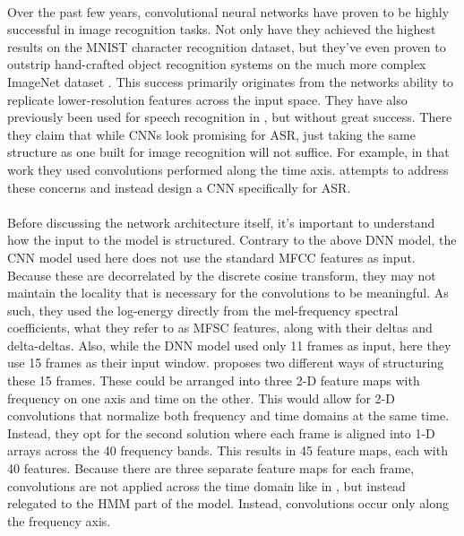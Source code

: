 \documentclass[letterpaper]{article}
\begin{document}
\paragraph{} Over the past few years, convolutional neural networks have proven to be highly successful in image recognition tasks. Not only have they achieved the highest results on the MNIST character recognition dataset\cite{DBLP:journals/corr/abs-1003-0358}, but they've even proven to outstrip hand-crafted object recognition systems on the much more complex ImageNet dataset \cite{DBLP:conf/nips/KrizhevskySH12}. This success primarily originates from the networks ability to replicate lower-resolution features across the input space. They have also previously been used for speech recognition in \cite{hau2011exploring}, but without great success. There they claim that while CNNs look promising for ASR, just taking the same structure as one built for image recognition will not suffice. For example, in that work they used convolutions performed along the time axis. \cite{DBLP:journals/taslp/Abdel-HamidMJDPY14} attempts to address these concerns and instead design a CNN specifically for ASR.

\paragraph{} Before discussing the network architecture itself, it's important to understand how the input to the model is structured. Contrary to the above DNN model, the CNN model used here does not use the standard MFCC features as input. Because these are decorrelated by the discrete cosine transform, they may not maintain the locality that is necessary for the convolutions to be meaningful. As such, they used the log-energy directly from the mel-frequency spectral coefficients, what they refer to as MFSC features, along with their deltas and delta-deltas. Also, while the DNN model used only 11 frames as input, here they use 15 frames as their input window. \cite{DBLP:journals/taslp/Abdel-HamidMJDPY14} proposes two different ways of structuring these 15 frames. These could be arranged into three 2-D feature maps with frequency on one axis and time on the other. This would allow for 2-D convolutions that normalize both frequency and time domains at the same time. Instead, they opt for the second solution where each frame is aligned into 1-D arrays across the 40 frequency bands. This results in 45 feature maps, each with 40 features. Because there are three separate feature maps for each frame, convolutions are not applied across the time domain like in \cite{hau2011exploring}, but instead relegated to the HMM part of the model. Instead, convolutions occur only along the frequency axis.
\end{document}
